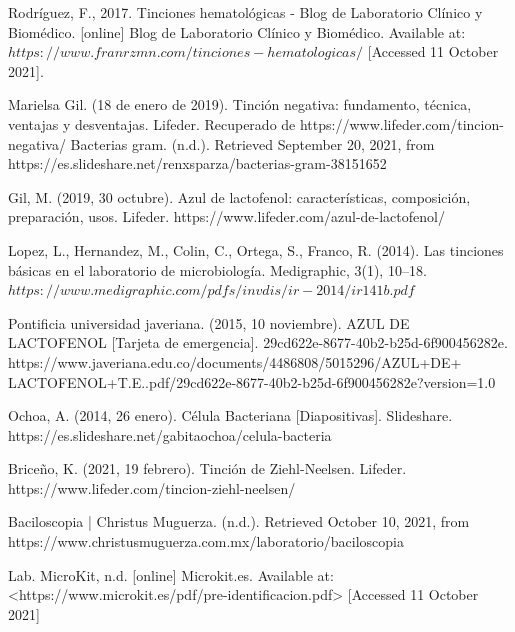 \documentclass[journal,transmag]{IEEEtran}
\begin{document}
\begin{thebibliography}{1}


  Rodríguez, F., 2017. Tinciones hematológicas - Blog de Laboratorio Clínico y Biomédico. [online] Blog de Laboratorio Clínico y Biomédico. Available at: $https://www.franrzmn.com/tinciones-hematologicas/$ [Accessed 11 October 2021].
 

 Marielsa Gil. (18 de enero de 2019). Tinción negativa: fundamento, técnica, ventajas y desventajas. Lifeder. Recuperado de https://www.lifeder.com/tincion-negativa/ Bacterias gram. (n.d.). Retrieved September 20, 2021, from https://es.slideshare.net/renxsparza/bacterias-gram-38151652 
 
 Gil, M. (2019, 30 octubre). Azul de lactofenol: características, composición, preparación, usos. Lifeder. https://www.lifeder.com/azul-de-lactofenol/

 
 Lopez, L., Hernandez, M., Colin, C., Ortega, S., Franco, R. (2014). Las tinciones básicas en el laboratorio de microbiología. Medigraphic, 3(1), 10–18. $https://www.medigraphic.com/pdfs/invdis/ir-2014/ir141b.pdf$
 
 
 Pontificia universidad javeriana. (2015, 10 noviembre). AZUL DE LACTOFENOL [Tarjeta de emergencia]. 29cd622e-8677-40b2-b25d-6f900456282e. 
 https://www.javeriana.edu.co/documents/4486808/5015296/AZUL+DE+
 LACTOFENOL+T.E..pdf/29cd622e-8677-40b2-b25d-6f900456282e?version=1.0

 
 Ochoa, A. (2014, 26 enero). Célula Bacteriana [Diapositivas]. Slideshare. https://es.slideshare.net/gabitaochoa/celula-bacteria
 
 Briceño, K. (2021, 19 febrero). Tinción de Ziehl-Neelsen. Lifeder. https://www.lifeder.com/tincion-ziehl-neelsen/

 
 Baciloscopia | Christus Muguerza. (n.d.). Retrieved October 10, 2021, from https://www.christusmuguerza.com.mx/laboratorio/baciloscopia

 
 Lab. MicroKit, n.d. [online] Microkit.es. Available at: <https://www.microkit.es/pdf/pre-identificacion.pdf> [Accessed 11 October 2021] 

 
 
 
\end{thebibliography}
\end{document}

